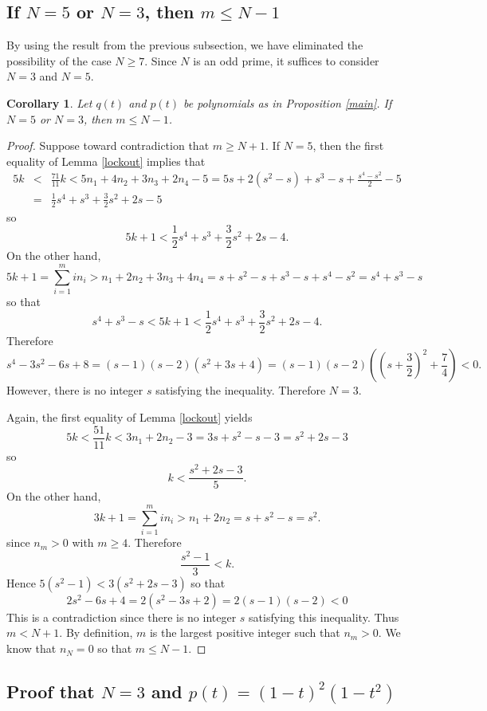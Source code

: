 \documentclass[reqno]{amsart}
\numberwithin{equation}{section}
\theoremstyle{plain}
\newtheorem{cor}[equation]{Corollary}
\theoremstyle{definition}
\begin{document}
\subsection{If $N=5$ or $N=3$, then $m\leq N-1$}\label{53m>N-1}

By using the result from the previous subsection, we have eliminated the possibility of the case $N\geq7$. Since $N$ is an odd prime, it suffices to consider $N=3$ and $N=5$.

\begin{cor}\label{not35}
    Let $q(t)$ and $p(t)$ be polynomials as in Proposition \ref{main}. If $N=5$ or $N=3$, then $m\leq N-1$.
\end{cor}
\begin{proof}
Suppose toward contradiction that $m\geq N+1$. If $N=5$, then the first equality of Lemma \ref{lockout} implies that
\begin{eqnarray*}
    5k&<&\frac{71}{11}k< 5n_1+4n_2+3n_3+2n_4-5=5s+2(s^2-s)+s^3-s+\frac{s^4-s^2}{2}-5\\
    &=&\frac{1}{2}s^4+s^3+\frac{3}{2}s^2+2s-5
\end{eqnarray*}
so
$$5k+1<\frac{1}{2}s^4+s^3+\frac{3}{2}s^2+2s-4.$$
On the other hand,
$$5k+1=\sum^m_{i=1}in_i> n_1+2n_2+3n_3+4n_4=s+s^2-s+s^3-s+s^4-s^2=s^4+s^3-s$$
so that
$$s^4+s^3-s<5k+1<\frac{1}{2}s^4+s^3+\frac{3}{2}s^2+2s-4.$$
Therefore 
$$s^4-3s^2-6s+8=(s-1)(s-2)(s^2+3s+4)=(s-1)(s-2)\left(\left(s+\frac{3}{2}\right)^2+\frac{7}{4}\right)<0.$$
However, there is no integer $s$ satisfying the inequality. Therefore $N=3$.

Again, the first equality of Lemma \ref{lockout} yields
$$5k<\frac{51}{11}k< 3n_1+2n_2-3=3s+s^2-s-3=s^2+2s-3$$
so
$$k<\frac{s^2+2s-3}{5}.$$
On the other hand,
$$3k+1=\sum^m_{i=1}in_i> n_1+2n_2=s+s^2-s=s^2.$$
since $n_m>0$ with $m\geq4$. Therefore 
$$\frac{s^2-1}{3}<k.$$
Hence $5(s^2-1)<3(s^2+2s-3)$ so that
$$2s^2-6s+4=2(s^2-3s+2)=2(s-1)(s-2)<0$$
This is a contradiction since there is no integer $s$ satisfying this inequality. Thus $m<N+1$. By definition, $m$ is the largest positive integer such that $n_m>0$. We know that $n_N=0$ so that $m\leq N-1$. 
\end{proof}


\subsection{Proof that $N=3$ and $p(t)=(1-t)^2(1-t^2)$}
\end{document}

